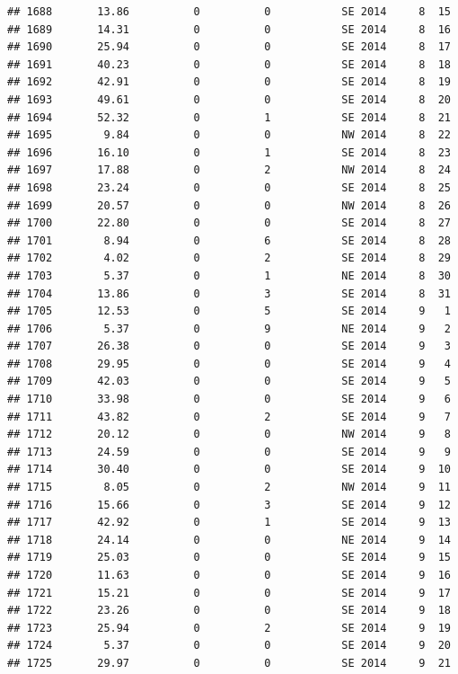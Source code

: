 \documentclass[
]{article}
\begin{document}
\begin{verbatim}
## 1688       13.86          0          0           SE 2014     8  15
## 1689       14.31          0          0           SE 2014     8  16
## 1690       25.94          0          0           SE 2014     8  17
## 1691       40.23          0          0           SE 2014     8  18
## 1692       42.91          0          0           SE 2014     8  19
## 1693       49.61          0          0           SE 2014     8  20
## 1694       52.32          0          1           SE 2014     8  21
## 1695        9.84          0          0           NW 2014     8  22
## 1696       16.10          0          1           SE 2014     8  23
## 1697       17.88          0          2           NW 2014     8  24
## 1698       23.24          0          0           SE 2014     8  25
## 1699       20.57          0          0           NW 2014     8  26
## 1700       22.80          0          0           SE 2014     8  27
## 1701        8.94          0          6           SE 2014     8  28
## 1702        4.02          0          2           SE 2014     8  29
## 1703        5.37          0          1           NE 2014     8  30
## 1704       13.86          0          3           SE 2014     8  31
## 1705       12.53          0          5           SE 2014     9   1
## 1706        5.37          0          9           NE 2014     9   2
## 1707       26.38          0          0           SE 2014     9   3
## 1708       29.95          0          0           SE 2014     9   4
## 1709       42.03          0          0           SE 2014     9   5
## 1710       33.98          0          0           SE 2014     9   6
## 1711       43.82          0          2           SE 2014     9   7
## 1712       20.12          0          0           NW 2014     9   8
## 1713       24.59          0          0           SE 2014     9   9
## 1714       30.40          0          0           SE 2014     9  10
## 1715        8.05          0          2           NW 2014     9  11
## 1716       15.66          0          3           SE 2014     9  12
## 1717       42.92          0          1           SE 2014     9  13
## 1718       24.14          0          0           NE 2014     9  14
## 1719       25.03          0          0           SE 2014     9  15
## 1720       11.63          0          0           SE 2014     9  16
## 1721       15.21          0          0           SE 2014     9  17
## 1722       23.26          0          0           SE 2014     9  18
## 1723       25.94          0          2           SE 2014     9  19
## 1724        5.37          0          0           SE 2014     9  20
## 1725       29.97          0          0           SE 2014     9  21

\end{verbatim}
\end{document}
